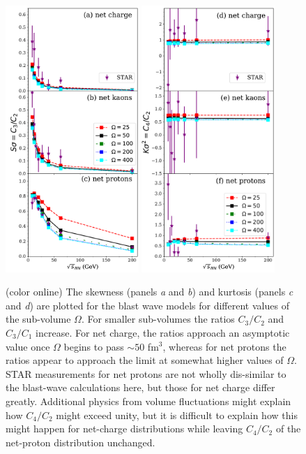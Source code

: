 \begin{figure}[htb]
\centerline{\includegraphics[width=0.45\textwidth]{figs/bw_skewness_omega}\hspace{0.06\textwidth}
\includegraphics[width=0.45\textwidth]{figs/bw_kurtosis_omega}}
\caption{\label{fig:bw_vs_omega}(color online) The skewness (panels {\it a} and {\it b}) and kurtosis (panels {\it c} and {\it d}) are plotted for the blast wave models for different values of the sub-volume $\Omega$. For smaller sub-volumes the ratios $C_3/C_2$ and $C_3/C_1$ increase. For net charge, the ratios approach an asymptotic value once $\Omega$ begins to pass $\sim 50$ fm$^3$, whereas for net protons the ratios appear to approach the limit at somewhat higher values of $\Omega$. STAR measurements for net protons are not wholly dis-similar to the blast-wave calculations here, but those for net charge differ greatly. Additional physics from volume fluctuations might explain how $C_4/C_2$ might exceed unity, but it is difficult to explain how this might happen for net-charge distributions while leaving $C_4/C_2$ of the net-proton distribution unchanged.}
\end{figure}
